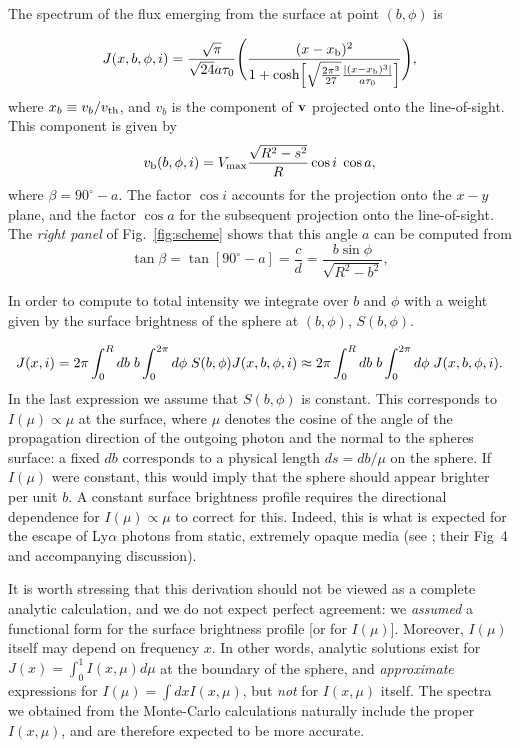 \documentclass{emulateapj}
\newcommand{\hs}{{\hspace{1mm}}}
\begin{document}
The spectrum of the flux emerging from the surface at point $(b,\phi)$ is 

\begin{displaymath}
J(x,b,\phi,i)=\frac{\sqrt{\pi}}{\sqrt{24}a\tau_0}\Bigg{(}\frac{(x-x_{\rm
    b})^2}{1+{\rm cosh}\Big{[}\sqrt{\frac{2\pi^3}{27}}\frac{|(x
      -x_{\rm b})^3|}{a\tau_0}\Big{]}}\Bigg{)},
\end{displaymath} 
%
where $x_b\equiv v_{b}/v_{\rm th}$, and $v_b$ is the component of ${\bf v}$ projected onto the line-of-sight. This component is given by
\begin{equation}
v_{\rm b}(b,\phi,i)=V_{\rm max}\frac{\sqrt{R^2 -s^2}}{R}\cos i  \hs
\cos a,
\end{equation}
where $\beta = 90^{\circ}-a$. The factor $\cos i$ accounts for the projection onto the $x-y$ plane, and the factor $\cos a$ for the subsequent projection onto the line-of-sight. The {\it right panel} of Fig.~\ref{fig:scheme} shows that this angle $a$ can be computed from
%
\begin{equation}
\tan \beta =\tan[90^{\circ}-a]=\frac{c}{d}=\frac{ b\sin \phi}{\sqrt{R^2 -b^2}},
\end{equation}
%

In order to compute to total intensity we integrate over $b$ and
$\phi$ with a weight given by the surface brightness of the
sphere at $(b,\phi)$, $S(b,\phi)$.

\begin{displaymath}
J(x,i)=2\pi \int_0^Rdb \hs b \int_0^{2\pi}d\phi \hs
S(b,\phi)J(x,b,\phi,i) \approx 2\pi \int_0^Rdb \hs b
\int_0^{2\pi}d\phi \hs J(x,b,\phi,i)\\ \nonumber.
\end{displaymath}
%
In the last expression we assume that $S(b,\phi)$ is constant. 
This corresponds to $I(\mu) \propto \mu$ at the surface, where $\mu$
denotes the cosine of the angle of the propagation direction of the
outgoing photon and the normal to the spheres surface: a fixed $db$
corresponds to a physical length $ds = db/\mu$ on the sphere.  
If $I(\mu)$ were constant, this would imply that the sphere should
appear brighter per unit $b$. 
A constant surface brightness profile requires the directional
dependence for $I(\mu) \propto \mu$ to correct for this. 
Indeed, this is what is expected for the escape of Ly$\alpha$ photons
from static, extremely opaque media (see \citet{Ahn01}; their
Fig~4 and accompanying discussion). 

It is worth stressing that this derivation should not be viewed as a
complete analytic calculation, and we do not expect perfect agreement:
we {\it assumed} a functional form for the surface brightness profile
[or for $I(\mu)$]. Moreover, $I(\mu)$ itself may depend on frequency $x$. In other words, analytic solutions exist for $J(x) =
\int_0^1 I(x,\mu) d\mu$ at the boundary of the sphere, and {\it approximate}
expressions for $I(\mu) =\int dx I(x,\mu)$, but {\it not} for $I(x,\mu)$
itself. The spectra we obtained from the Monte-Carlo calculations naturally include the proper $I(x,\mu)$, and are therefore expected to be more accurate.



 
\end{document}
